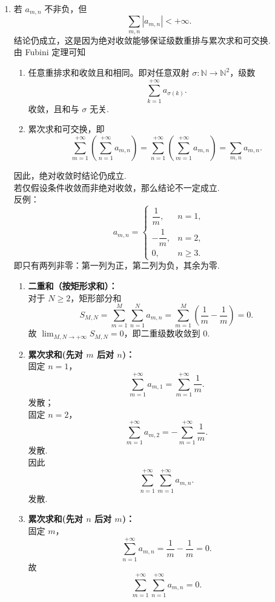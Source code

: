 \begin{solution}
\begin{enumerate}[leftmargin=*,label=\arabic*.]
    \item
    若 $a_{m,n}$ 不非负，但 
    \[
    \sum_{m,n} |a_{m,n}| < +\infty.
    \]结论仍成立，这是因为绝对收敛能够保证级数重排与累次求和可交换.\\
    由 Fubini 定理可知
    \begin{enumerate}
    \item[i.] 任意重排求和收敛且和相同。即对任意双射 $\sigma: \mathbb{N} \to \mathbb{N}^2$，级数 
    \[
    \sum_{k=1}^{+\infty} a_{\sigma(k)}.
    \]收敛，且和与 $\sigma$ 无关.
    \item[ii.] 累次求和可交换，即
        \[
        \sum_{m=1}^{+\infty} \left( \sum_{n=1}^{+\infty} a_{m,n} \right) = \sum_{n=1}^{+\infty} \left( \sum_{m=1}^{+\infty} a_{m,n} \right) = \sum_{m,n} a_{m,n}.
        \]
    \end{enumerate}
    因此，绝对收敛时结论仍成立.\\
    若仅假设条件收敛而非绝对收敛，那么结论不一定成立.\\
    反例：
    \[
    a_{m,n} = \begin{cases}
        \dfrac{1}{m}, & n = 1, \\[6pt]
        -\dfrac{1}{m}, & n = 2, \\[6pt]
        0, & n \geq 3.
    \end{cases}
    \]
    即只有两列非零：第一列为正，第二列为负，其余为零.
    \begin{enumerate}
        \item[i.] \textbf{二重和（按矩形求和）：}\\
        对于 $N \geq 2$，矩形部分和
        \[
        S_{M,N} = \sum_{m=1}^{M} \sum_{n=1}^{N} a_{m,n} = \sum_{m=1}^{M} \left( \frac{1}{m} - \frac{1}{m} \right) = 0.
        \]
        故 $\displaystyle \lim_{M,N \to +\infty} S_{M,N} = 0$，即二重级数收敛到 $0$.
        
        \item[ii.] \textbf{累次求和(先对 $m$ 后对 $n$)：}\\
        固定 $n = 1$，
        \[
        \sum_{m=1}^{+\infty} a_{m,1} = \sum_{m=1}^{+\infty} \frac{1}{m}.
        \]发散；\\
        固定 $n = 2$，
        \[
        \sum_{m=1}^{+\infty} a_{m,2} = -\sum_{m=1}^{+\infty} \frac{1}{m}.
        \]发散.\\
        因此 
        \[
        \sum_{n=1}^{+\infty} \sum_{m=1}^{+\infty} a_{m,n}.
        \]
        发散.
        
        \item[iii.] \textbf{累次求和(先对 $n$ 后对 $m$)：}\\
        固定 $m$，
        \[
        \sum_{n=1}^{+\infty} a_{m,n} = \frac{1}{m} - \frac{1}{m} = 0.
        \]
        故 
        \[
        \sum_{m=1}^{+\infty} \sum_{n=1}^{+\infty} a_{m,n} = 0.
        \]
        

\end{enumerate}
\end{enumerate}
\end{solution}
